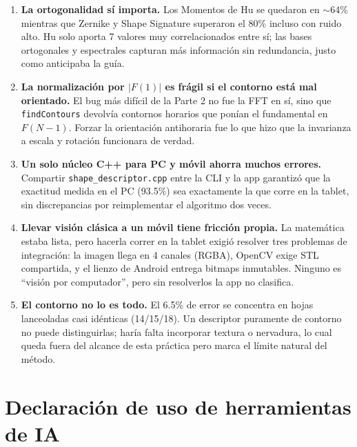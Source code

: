 \documentclass[12pt,a4paper]{article}
\begin{document}
\begin{enumerate}

\item \textbf{La ortogonalidad sí importa.} Los Momentos de Hu se quedaron en $\sim$64\% mientras que Zernike y Shape Signature superaron el 80\% incluso con ruido alto. Hu solo aporta 7 valores muy correlacionados entre sí; las bases ortogonales y espectrales capturan más información sin redundancia, justo como anticipaba la guía.

\item \textbf{La normalización por $|F(1)|$ es frágil si el contorno está mal orientado.} El bug más difícil de la Parte 2 no fue la FFT en sí, sino que \texttt{findContours} devolvía contornos horarios que ponían el fundamental en $F(N-1)$. Forzar la orientación antihoraria fue lo que hizo que la invarianza a escala y rotación funcionara de verdad.

\item \textbf{Un solo núcleo C++ para PC y móvil ahorra muchos errores.} Compartir \texttt{shape\_descriptor.cpp} entre la CLI y la app garantizó que la exactitud medida en el PC (93.5\%) sea exactamente la que corre en la tablet, sin discrepancias por reimplementar el algoritmo dos veces.

\item \textbf{Llevar visión clásica a un móvil tiene fricción propia.} La matemática estaba lista, pero hacerla correr en la tablet exigió resolver tres problemas de integración: la imagen llega en 4 canales (RGBA), OpenCV exige STL compartida, y el lienzo de Android entrega bitmaps inmutables. Ninguno es ``visión por computador'', pero sin resolverlos la app no clasifica.

\item \textbf{El contorno no lo es todo.} El 6.5\% de error se concentra en hojas lanceoladas casi idénticas (14/15/18). Un descriptor puramente de contorno no puede distinguirlas; haría falta incorporar textura o nervadura, lo cual queda fuera del alcance de esta práctica pero marca el límite natural del método.

\end{enumerate}

\section*{Declaración de uso de herramientas de IA}
\end{document}
